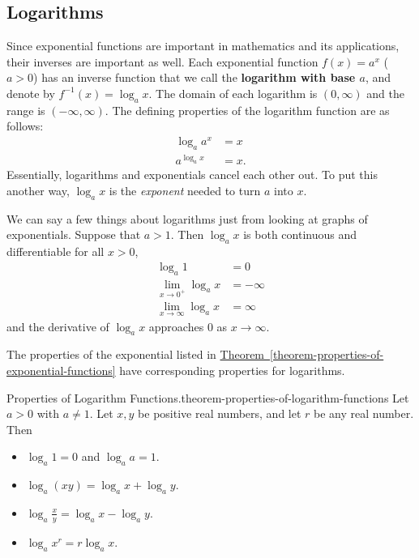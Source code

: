 \documentclass[10pt,]{book}
\newcommand{\terminology}[1]{\textbf{#1}}
\numberwithin{equation}{section}
\begin{document}
\subsection[{Logarithms}]{Logarithms}\label{subsection-logarithms}
\hypertarget{p-217}{}%
Since exponential functions are important in mathematics and its applications, their inverses are important as well. Each exponential function \(f(x) = a^{x}\) (\(a> 0\)) has an inverse function that we call the \terminology{logarithm with base \(a\)}, and denote by \(f^{-1}(x) = \log_{a}x\). The domain of each logarithm is \((0,\infty)\) and the range is \((-\infty,\infty)\). The defining properties of the logarithm function are as follows:%
\begin{align*}
\log_{a}a^{x} & = x \\
a^{\log_{a}x} & = x. 
\end{align*}
Essentially, logarithms and exponentials cancel each other out. To put this another way, \(\log_{a}x\) is the \emph{exponent} needed to turn \(a\) into \(x\).%
\par
\hypertarget{p-218}{}%
We can say a few things about logarithms just from looking at graphs of exponentials. Suppose that \(a>1\). Then \(\log_{a}x\) is both continuous and differentiable for all \(x>0\),%
\begin{align*}
\log_{a}1 & = 0 \\
\lim_{x\to0^{+}}\log_{a}x & = -\infty \\
\lim_{x\to\infty}\log_{a}x & = \infty 
\end{align*}
and the derivative of \(\log_{a}x\) approaches \(0\) as \(x\to\infty\).%
\par
\hypertarget{p-219}{}%
The properties of the exponential listed in \hyperref[theorem-properties-of-exponential-functions]{Theorem~\ref{theorem-properties-of-exponential-functions}} have corresponding properties for logarithms.%
\begin{theorem}{Properties of Logarithm Functions.}{}{theorem-properties-of-logarithm-functions}%
\hypertarget{p-220}{}%
Let \(a>0\) with \(a\neq1\). Let \(x,y\) be positive real numbers, and let \(r\) be any real number. Then \leavevmode%
\begin{itemize}[label=\textbullet]
\item{}\(\log_{a}1 = 0\) and \(\log_{a}a = 1\).%
\item{}\(\log_{a}(xy) = \log_{a}x + \log_{a}y\).%
\item{}\(\log_{a}\frac{x}{y} = \log_{a}x - \log_{a}y\).%
\item{}\(\log_{a}x^{r} = r\log_{a}x\).%
\end{itemize}
%
\end{theorem}
\end{document}
